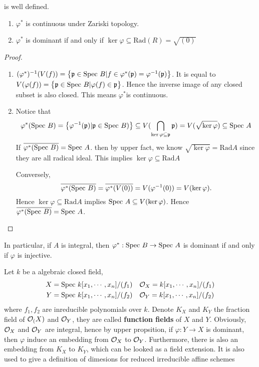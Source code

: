 is well defined.
\begin{secprop}
	\begin{enumerate}
		\item $\varphi^*$ is continuous under Zariski topology.
		\item $\varphi^*$ is dominant if and only if $\ker \varphi \subseteq \text{Rad}(R)=\sqrt{(0)}$
	\end{enumerate}
\end{secprop}
\begin{proof}
	\begin{enumerate}
		\item $(\varphi^*)^{-1}(V(f))= \big\{ \mathfrak{p} \in \text{Spec } B | f \in\varphi^*(\mathfrak{p}) = \varphi^{-1}(\mathfrak{p}) \big\}$. It is equal to $V(\varphi(f))= \big\{\mathfrak{p} \in \text{Spec } B| \varphi(f) \in \mathfrak{p}  \big\}$. Hence the inverse image of any closed subset is also closed. This means $\varphi^*$is continuous.
		\item Notice that 
		\[
		\varphi^*(\text{Spec } B) = \big\{ \varphi^{-1}(\mathfrak{p})| \mathfrak{p} \in \text{Spec } B)\big\} \subseteq V(\bigcap_{ \ker \varphi \subseteq \mathfrak{p}} \mathfrak{p}) = V(\sqrt{\ker \varphi}) \subseteq \text{Spec } A
		\]
		If $\overline{\varphi^* (\text{Spec } B)} = \text{Spec } A$. then by upper fact, we know $\sqrt{\ker \varphi}= \text{Rad} A$ since they are all radical ideal. This implies $\ker \varphi \subseteq \text{Rad} A$
		
		Conversely, 
		\[
		\overline{\varphi^* (\text{Spec } B)} = \overline{\varphi^* (V(0))} = V(\varphi^{-1}(0) )= V(\ker \varphi).
		\]
		Hence $\ker \varphi \subseteq \text{Rad}A$ implies $\text{Spec } A \subseteq V(\ker \varphi)$. Hence $\overline{\varphi^* (\text{Spec } B)} = \text{Spec } A$.
	\end{enumerate}
\end{proof}
In particular, if $A$ is integral, then $\varphi^* : \text{Spec } B \rightarrow \text{Spec } A$ is dominant if and only if $\varphi$ is injective.
\begin{ex}
	Let $k$ be a algebraic closed field,
	\[
	\begin{aligned}
	X&=\text{Spec } k[x_1, \cdots, x_n]/(f_1)& & \mathcal{O}_{X}= k[x_1, \cdots, x_n]/(f_1)\\
	Y&=\text{Spec } k[x_1, \cdots, x_n]/(f_2)& &\mathcal{O}_{Y}=k[x_1, \cdots, x_n]/(f_2)
	\end{aligned}
	\]
	where $f_1, f_2$ are inreducible polynomials over $k$. Denote $K_X$ and $K_Y$ the fraction field of $\mathcal{O}_{(}X)$ and $\mathcal{O}_{Y}$, they are called \textbf{function fields} of $X$ and $Y$. Obviously, $\mathcal{O}_{X}$ and $\mathcal{O}_{Y}$ are integral, hence by upper propsition, if $\varphi: Y \rightarrow X$ is dominant, then $\varphi$ induce an embedding from $\mathcal{O}_{X}$ to $\mathcal{O}_{Y}$. Furthermore, there is also an embedding from $K_X$ to $K_Y$, which can be looked as a field extension. It is also used to give a definition of dimesions for reduced irreducible affine schemes
\end{ex}

